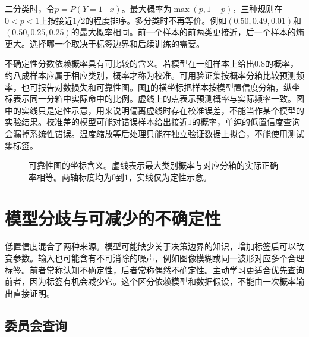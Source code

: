 二分类时，令$p=P(Y=1\mid x)$。最大概率为$\max(p,1-p)$，三种规则在$0<p<1$上按接近$1/2$的程度排序。多分类时不再等价。例如$(0.50,0.49,0.01)$和$(0.50,0.25,0.25)$的最大概率相同。前一个样本的前两类更接近，后一个样本的熵更大。选择哪一个取决于标签边界和后续训练的需要。

不确定性分数依赖概率具有可比较的含义。若模型在一组样本上给出$0.8$的概率，约八成样本应属于相应类别，概率才称为校准。可用验证集按概率分箱比较预测频率，也可报告对数损失和可靠性图。图\ref{fig:active-calibration}的横坐标把样本按模型置信度分箱，纵坐标表示同一分箱中实际命中的比例。虚线上的点表示预测概率与实际频率一致。图中的实线只是定性示意，用来说明偏离虚线时存在校准误差，不能当作某个模型的实验结果。校准差的模型可能对错误样本给出接近$1$的概率，单纯的低置信度查询会漏掉系统性错误。温度缩放等后处理只能在独立验证数据上拟合，不能使用测试集标签。

\begin{figure}[htbp]
\centering
{}
\caption{可靠性图的坐标含义。虚线表示最大类别概率与对应分箱的实际正确率相等。两轴标度均为$0$到$1$，实线仅为定性示意。}
\label{fig:active-calibration}
\end{figure}

\section{模型分歧与可减少的不确定性}

低置信度混合了两种来源。模型可能缺少关于决策边界的知识，增加标签后可以改变参数。输入也可能含有不可消除的噪声，例如图像模糊或同一波形对应多个合理标签。前者常称认知不确定性，后者常称偶然不确定性。主动学习更适合优先查询前者，因为标签有机会减少它。这个区分依赖模型和数据假设，不能由一次概率输出直接证明。

\subsection{委员会查询}

